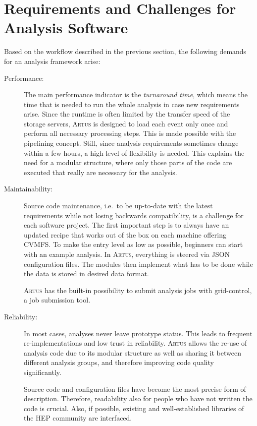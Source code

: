 \documentclass[3p]{elsarticle}
\newcommand{\software}[1]{\textsc{#1}\xspace}
\newcommand{\artus}{\software{Artus}}
\begin{document}

\section{Requirements and Challenges for Analysis Software}
\label{section_artus_challenges}
Based on the workflow described in the previous section, the following demands for an analysis framework arise:

\begin{description}
\item[Performance:]
The main performance indicator is the \emph{turnaround time}, which means the time that is needed to run the whole analysis in case new requirements arise.
Since the runtime is often limited by the transfer speed of the storage servers, \artus is designed to load each event only once and perform all necessary processing steps.
This is made possible with the pipelining concept.
Still, since analysis requirements sometimes change within a few hours, a high level of flexibility is needed.
This explains the need for a modular structure, where only those parts of the code are executed that really are necessary for the analysis.

\item[Maintainability:]
Source code maintenance, i.e.\ to be up-to-date with the latest requirements while not losing backwards compatibility, is a challenge for each software project.
The first important step is to always have  an updated recipe that works out of the box on each machine offering CVMFS.
To make the entry level as low as possible, beginners can start with an example analysis.
In \artus, everything is steered via JSON configuration files.
The modules then implement what has to be done while the data is stored in desired data format.

\artus has the built-in possibility to submit analysis jobs with grid-control, a job submission tool.

\item[Reliability:]
In most cases, analyses never leave prototype status.
This leads to frequent re-imple\-men\-ta\-tions and low trust in reliability.
\artus allows the re-use of analysis code due to its modular structure as well as sharing it between different analysis groups, and therefore improving code quality significantly.

Source code and configuration files have become the most precise form of description.
Therefore, readability also for people who have not written the code is crucial.
Also, if possible, existing and well-established libraries of the HEP community are interfaced.
\end{description}
\end{document}
